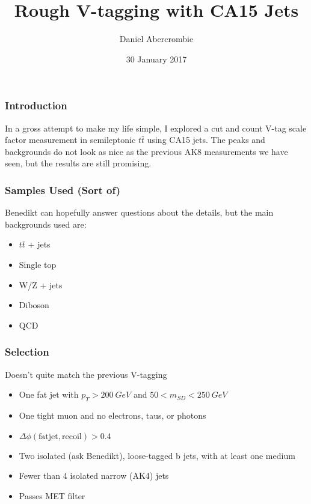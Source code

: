 \documentclass{beamer}
\author[D. Abercrombie]{
  Daniel Abercrombie
}
\title{\bf \sffamily Rough V-tagging with CA15 Jets}
\date{30 January 2017}
\newcommand{\ttbar}{$t\bar{t}$ }
\begin{document}
\begin{frame}[nonumbering]
  \titlepage
\end{frame}

\begin{frame}
  \frametitle{Introduction}

  In a gross attempt to make my life simple, I explored a cut and count V-tag scale factor measurement
  in semileptonic \ttbar using CA15 jets.
  The peaks and backgrounds do not look as nice as the previous AK8 measurements we have seen,
  but the results are still promising.

\end{frame}

\begin{frame}
  \frametitle{Samples Used (Sort of)}

  Benedikt can hopefully answer questions about the details, but the main backgrounds used are:

  \begin{itemize}
  \item \ttbar + jets
  \item Single top
  \item W/Z + jets
  \item Diboson
  \item QCD
  \end{itemize}

\end{frame}

\begin{frame}
  \frametitle{Selection}

  Doesn't quite match the previous V-tagging

  \begin{itemize}
  \item One fat jet with $p_T > \SI{200}{GeV}$ and $50 < m_{SD} < \SI{250}{GeV}$
  \item One tight muon and no electrons, taus, or photons
  \item $\Delta\phi\mathrm{(fat jet, recoil)} > 0.4$
  \item Two isolated (ask Benedikt), loose-tagged b jets, with at least one medium
  \item Fewer than 4 isolated narrow (AK4) jets
  \item Passes MET filter
  \end{itemize}

\end{frame}
\end{document}
